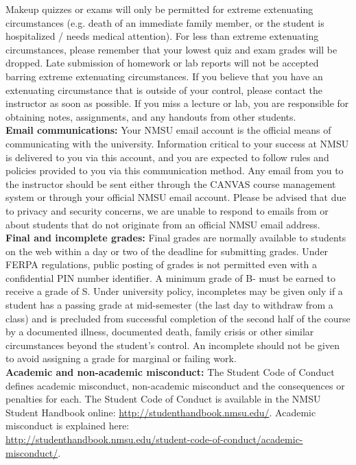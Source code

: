 \documentclass{article}
\begin{document}
\noindent Makeup quizzes or exams will only be permitted for extreme extenuating circumstances (e.g. death of an immediate family member, or the student is hospitalized / needs medical attention). For less than extreme extenuating circumstances, please remember that your lowest quiz and exam grades will be dropped. Late submission of homework or lab reports will not be accepted barring extreme extenuating circumstances. If you believe that you have an extenuating circumstance that is outside of your control, please contact the instructor as soon as possible. If you miss a lecture or lab, you are responsible for obtaining notes, assignments, and any handouts from other students. \\

\noindent\textbf{Email communications:} Your NMSU email account is the official means of communicating with the university.  Information critical to your success at NMSU is delivered to you via this account, and you are expected to follow rules and policies provided to you via this communication method.  Any email from you to the instructor should be sent either through the CANVAS course management system or through your official NMSU email account. Please be advised that due to privacy and security concerns, we are unable to respond to emails from or about students that do not originate from an official NMSU email address. \\

\noindent\textbf{Final and incomplete grades:} Final grades are normally available to students on the web within a day or two of the deadline for submitting grades. Under FERPA regulations, public posting of grades is not permitted even with a confidential PIN number identifier. A minimum grade of B- must be earned to receive a grade of S. Under university policy, incompletes may be given only if a student has a passing grade at mid-semester (the last day to withdraw from a class) and is precluded from successful completion of the second half of the course by a documented illness, documented death, family crisis or other similar circumstances beyond the student's control. An incomplete should not be given to avoid assigning a grade for marginal or failing work. \\

\noindent\textbf{Academic and non-academic misconduct:}
The Student Code of Conduct defines academic misconduct, non-academic misconduct and the consequences or penalties for each.  The Student Code of Conduct is available in the NMSU Student Handbook online:  \url{http://studenthandbook.nmsu.edu/}. Academic misconduct is explained here: \\ \url{http://studenthandbook.nmsu.edu/student-code-of-conduct/academic-misconduct/}. \\
\end{document}

